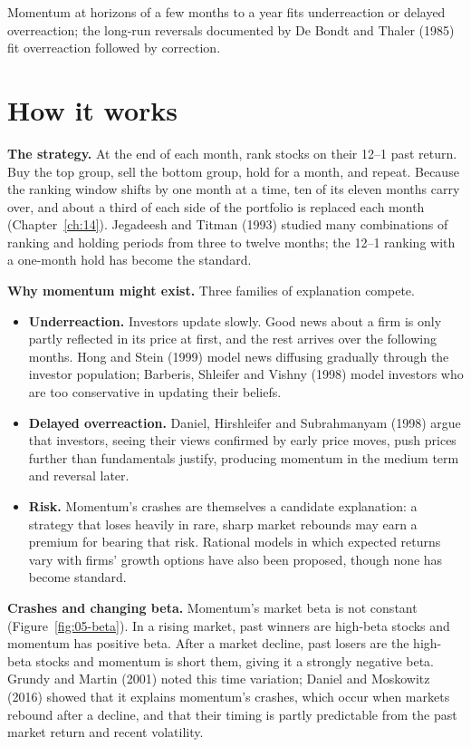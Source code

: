 Momentum at horizons of a few months to a year fits underreaction or delayed overreaction; the long-run reversals documented by De Bondt and Thaler (1985) fit overreaction followed by correction.


\section{How it works}
\label{sec:05-how}

\textbf{The strategy.} At the end of each month, rank stocks on their 12--1 past return. Buy the top group, sell the bottom group, hold for a month, and repeat. Because the ranking window shifts by one month at a time, ten of its eleven months carry over, and about a third of each side of the portfolio is replaced each month (Chapter~\ref{ch:14}). Jegadeesh and Titman (1993) studied many combinations of ranking and holding periods from three to twelve months; the 12--1 ranking with a one-month hold has become the standard.

\textbf{Why momentum might exist.} Three families of explanation compete.

\begin{itemize}
  \item \textbf{Underreaction.} Investors update slowly. Good news about a firm is only partly reflected in its price at first, and the rest arrives over the following months. Hong and Stein (1999) model news diffusing gradually through the investor population; Barberis, Shleifer and Vishny (1998) model investors who are too conservative in updating their beliefs.
  \item \textbf{Delayed overreaction.} Daniel, Hirshleifer and Subrahmanyam (1998) argue that  investors, seeing their views confirmed by early price moves, push prices further than fundamentals justify, producing momentum in the medium term and reversal later.
  \item \textbf{Risk.} Momentum's crashes are themselves a candidate explanation: a strategy that loses heavily in rare, sharp market rebounds may earn a premium for bearing that risk. Rational models in which expected returns vary with firms' growth options have also been proposed, though none has become standard.
\end{itemize}

\textbf{Crashes and changing beta.} Momentum's market beta is not constant (Figure~\ref{fig:05-beta}). In a rising market, past winners are high-beta stocks and momentum has positive beta. After a market decline, past losers are the high-beta stocks and momentum is short them, giving it a strongly negative beta. Grundy and Martin (2001) noted this time variation; Daniel and Moskowitz (2016) showed that it explains momentum's crashes, which occur when markets rebound after a decline, and that their timing is partly predictable from the past market return and recent volatility.

